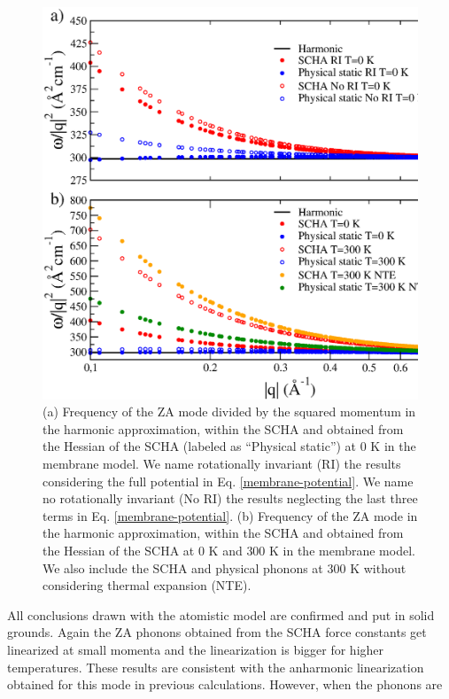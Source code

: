 \begin{figure}[h]
\includegraphics[width=\linewidth]{Figures/membrane.eps}
	\caption[ZA harmonic and anharmonic phonons in the membrane model.]{(a) Frequency of the ZA mode divided by 
	the squared momentum in the harmonic approximation, within the SCHA and obtained from the Hessian of the SCHA
	(labeled as ``Physical static'') at 0 K in the membrane model. We name rotationally invariant (RI) the 
	results considering the full potential in Eq. \ref{membrane-potential}. We name no rotationally invariant (No 
	RI) the results neglecting the last three terms in Eq. \ref{membrane-potential}. (b) Frequency of the ZA mode 
	in the harmonic approximation, within the SCHA and obtained from the Hessian of the SCHA at $0$ K and $300$ K
	in the membrane model. We also include the SCHA and physical phonons at $300$ K without considering thermal 
	expansion (NTE).}
\label{membrane-results}
\end{figure}
All conclusions drawn with the atomistic model are confirmed and put in solid grounds. Again the ZA phonons obtained 
from the SCHA force constants get linearized at small momenta and the linearization is bigger for higher 
temperatures. These results are consistent with the anharmonic linearization obtained for this mode in previous 
calculations\cite{mariani2008flexural,amorim2014thermodynamics,de2012bending}. However, when the phonons are 
